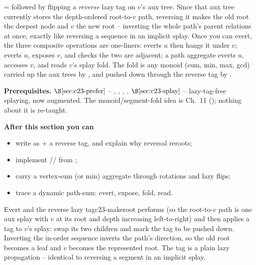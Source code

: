 \begin{topicintro}
 =  followed by flipping a \emph{reverse} lazy tag
on \(v\)'s aux tree. Since that aux tree currently stores the depth-ordered
root-to-\(v\) path, reversing it makes the old root the deepest node and \(v\) the
new root -- inverting the whole path's parent relations at once, exactly like
reversing a sequence in an implicit splay. Once you can evert, the three composite
operations are one-liners:  everts \(u\) then hangs it under \(v\);
 everts \(u\), exposes \(v\), and checks the two are adjacent; a path
aggregate  everts \(u\), accesses \(v\), and reads \(v\)'s splay
fold. The fold is any monoid (sum, min, max, gcd) carried up the aux trees by
, and pushed down through the reverse tag by .

\textbf{Prerequisites.} \(\secref{c23-prefer}\) -- , ,
, . \(\secref{c23-splay}\) -- lazy-tag-free splaying,
now augmented. The monoid/segment-fold idea is Ch.~11 (); nothing about it
is re-taught.

\textbf{After this section you can}
\begin{itemize}[nosep]
  \item write  as  + a reverse tag, and explain why
        reversal reroots; \hfill{}
  \item implement // from ; \hfill{}
  \item carry a vertex-sum (or min) aggregate through rotations and lazy flips; \hfill{}
  \item trace a dynamic path-sum: evert, expose, fold, read. \hfill{}
\end{itemize}
\end{topicintro}

\begin{definition}{Evert and the reverse lazy tag}{c23-makeroot}
 performs  (so the root-to-\(v\) path is one aux
splay with \(v\) at its root and depth increasing left-to-right) and then applies a
 tag to \(v\)'s splay: swap its two children and mark the tag to be
pushed down. Inverting the in-order sequence inverts the path's direction, so the
old root becomes a leaf and \(v\) becomes the represented root. The tag is a plain
lazy propagation -- identical to reversing a segment in an implicit splay.
\end{definition}

